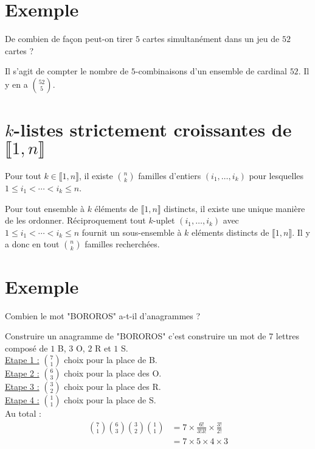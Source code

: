 \documentclass[../main.tex]{subfiles}
\begin{document}
\section{Exemple}
\begin{tcolorbox}[title=Exemple 31.40, title filled=false, colframe=darkgreen, colback=darkgreen!10!white]
    De combien de façon peut-on tirer $5$ cartes simultanément dans un jeu de $52$ cartes ?
\end{tcolorbox}

\noindent Il s'agit de compter le nombre de $5$-combinaisons d'un ensemble de cardinal $52$. Il y en a $\binom{52}{5}$.

\section{$k$-listes strictement croissantes de $\llbracket 1, n \rrbracket$}
\begin{tcolorbox}[title=Théorème 31.41, title filled=false, colframe=orange, colback=orange!10!white]
    Pour tout $k\in \llbracket 1, n \rrbracket$, il existe $\binom{n}{k}$ familles d'entiers $(i_1, \ldots, i_k)$ pour lesquelles $1\leq i_1 < \cdots < i_k \leq n$.
\end{tcolorbox}

\noindent Pour tout ensemble à $k$ éléments de $\llbracket 1, n \rrbracket$ distincts, il existe une unique manière de les ordonner. Réciproquement tout $k$-uplet $(i_1, \ldots, i_k)$ avec $1\leq i_1 < \cdots < i_k \leq n$ fournit un sous-ensemble à $k$ eléments distincts de $\llbracket 1, n \rrbracket$. Il y a donc en tout $\binom{n}{k}$ familles recherchées. 

\section{Exemple}
\begin{tcolorbox}[title=Exemple 31.43, title filled=false, colframe=darkgreen, colback=darkgreen!10!white]
    Combien le mot "BOROROS" a-t-il d'anagrammes ?
\end{tcolorbox}

\noindent Construire un anagramme de "BOROROS" c'est construire un mot de 7 lettres composé de $1$ B, $3$ O, $2$ R et $1$ S. \\
\noindent\underline{Etape 1 :} $\binom{7}{1}$ choix pour la place de B. \\
\noindent\underline{Etape 2 :} $\binom{6}{3}$ choix pour la place des O. \\
\noindent\underline{Etape 3 :} $\binom{3}{2}$ choix pour la place des R. \\
\noindent\underline{Etape 4 :} $\binom{1}{1}$ choix pour la place de S. \\
Au total : 
\begin{align*}
    \binom{7}{1} \binom{6}{3} \binom{3}{2} \binom{1}{1} &= 7 \times \frac{6!}{3!3!} \times \frac{3!}{2!} \\
    &= 7 \times 5 \times 4 \times 3
\end{align*}
\end{document}
